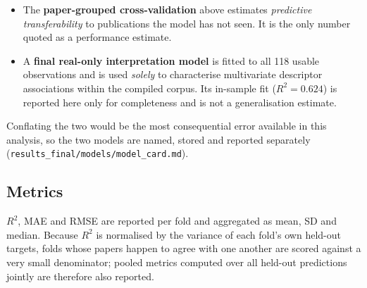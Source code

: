 \begin{itemize}
\item The \textbf{paper-grouped cross-validation} above estimates \emph{predictive
transferability} to publications the model has not seen. It is the only number quoted as a
performance estimate.
\item A \textbf{final real-only interpretation model} is fitted to all 118 usable
observations and is used \emph{solely} to characterise multivariate descriptor
associations within the compiled corpus. Its in-sample fit
($R^2 = 0.624$) is reported here only for
completeness and is not a generalisation estimate.
\end{itemize}

Conflating the two would be the most consequential error available in this analysis, so the
two models are named, stored and reported separately
(\texttt{results\_final/models/model\_card.md}).

\subsection{Metrics}
$R^2$, MAE and RMSE are reported per fold and aggregated as mean, SD and median. Because
$R^2$ is normalised by the variance of each fold's own held-out targets, folds whose papers
happen to agree with one another are scored against a very small denominator; pooled metrics
computed over all held-out predictions jointly are therefore also reported.
